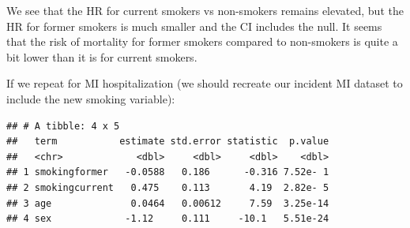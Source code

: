 \documentclass[
]{book}
\newenvironment{Shaded}{\begin{snugshade}}{\end{snugshade}}
\newcommand{\DataTypeTok}[1]{\textcolor[rgb]{0.13,0.29,0.53}{#1}}
\newcommand{\DecValTok}[1]{\textcolor[rgb]{0.00,0.00,0.81}{#1}}
\newcommand{\FloatTok}[1]{\textcolor[rgb]{0.00,0.00,0.81}{#1}}
\newcommand{\KeywordTok}[1]{\textcolor[rgb]{0.13,0.29,0.53}{\textbf{#1}}}
\newcommand{\NormalTok}[1]{#1}
\newcommand{\OperatorTok}[1]{\textcolor[rgb]{0.81,0.36,0.00}{\textbf{#1}}}
\newcommand{\StringTok}[1]{\textcolor[rgb]{0.31,0.60,0.02}{#1}}
\begin{document}
We see that the HR for current smokers vs non-smokers remains elevated, but the HR for former smokers is much smaller and the CI includes the null. It seems that the risk of mortality for former smokers compared to non-smokers is quite a bit lower than it is for current smokers.

If we repeat for MI hospitalization (we should recreate our incident MI dataset to include the new smoking variable):

\begin{Shaded}
\end{Shaded}

\begin{verbatim}
## # A tibble: 4 x 5
##   term           estimate std.error statistic  p.value
##   <chr>             <dbl>     <dbl>     <dbl>    <dbl>
## 1 smokingformer   -0.0588   0.186      -0.316 7.52e- 1
## 2 smokingcurrent   0.475    0.113       4.19  2.82e- 5
## 3 age              0.0464   0.00612     7.59  3.25e-14
## 4 sex             -1.12     0.111     -10.1   5.51e-24
\end{verbatim}

\begin{Shaded}
\end{Shaded}
\end{document}
